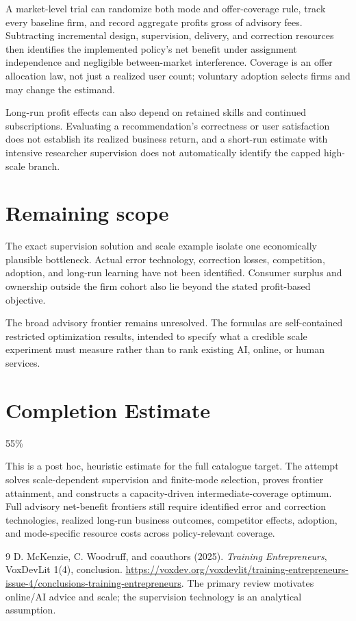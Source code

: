\documentclass[11pt,a4paper]{article}
\begin{document}
A market-level trial can randomize both mode and offer-coverage rule, track every baseline firm, and record aggregate profits gross of advisory fees. Subtracting incremental design, supervision, delivery, and correction resources then identifies the implemented policy's net benefit under assignment independence and negligible between-market interference. Coverage is an offer allocation law, not just a realized user count; voluntary adoption selects firms and may change the estimand.

Long-run profit effects can also depend on retained skills and continued subscriptions. Evaluating a recommendation's correctness or user satisfaction does not establish its realized business return, and a short-run estimate with intensive researcher supervision does not automatically identify the capped high-scale branch.
\section{Remaining scope}
The exact supervision solution and scale example isolate one economically plausible bottleneck. Actual error technology, correction losses, competition, adoption, and long-run learning have not been identified. Consumer surplus and ownership outside the firm cohort also lie beyond the stated profit-based objective.

The broad advisory frontier remains unresolved. The formulas are self-contained restricted optimization results, intended to specify what a credible scale experiment must measure rather than to rank existing AI, online, or human services.

\section{Completion Estimate}
55\%

This is a post hoc, heuristic estimate for the full catalogue target.
The attempt solves scale-dependent supervision and finite-mode selection, proves frontier attainment, and constructs a capacity-driven intermediate-coverage optimum. Full advisory net-benefit frontiers still require identified error and correction technologies, realized long-run business outcomes, competitor effects, adoption, and mode-specific resource costs across policy-relevant coverage.

\begin{thebibliography}{9}
 D. McKenzie, C. Woodruff, and coauthors (2025).
\emph{Training Entrepreneurs}, VoxDevLit 1(4), conclusion.
\url{https://voxdev.org/voxdevlit/training-entrepreneurs-issue-4/conclusions-training-entrepreneurs}.
The primary review motivates online/AI advice and scale; the supervision technology is an analytical assumption.
\end{thebibliography}
\end{document}
